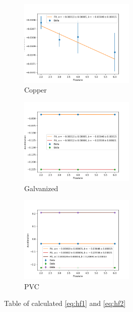 


\begin{figure}[h!]
    \centering
    \includegraphics[width=55mm]
    {Python/Lab6/Plots/copper_axis0.png}
    \caption{Copper} 
    \label{fig:copper}
\end{figure}

\begin{figure}[h!]
    \centering
    \includegraphics[width=55mm]
    {Python/Lab6/Plots/galvanized_axis0.png}
    \caption{Galvanized} 
    \label{fig:galvanized}
\end{figure}
  
\begin{figure}[h!]
    \centering
    \includegraphics[width=55mm]
    {Python/Lab6/Plots/pvc_axis0.png}
    \caption{PVC} 
    \label{fig:PVC}
\end{figure}

  




\begin{table}[h!]
\resizebox{\columnwidth}{!}{%

}
\caption{Table of calculated  \ref{eq:hf1} and \ref{eq:hf2}}
\label{table:hf1hf2}


\end{table}

